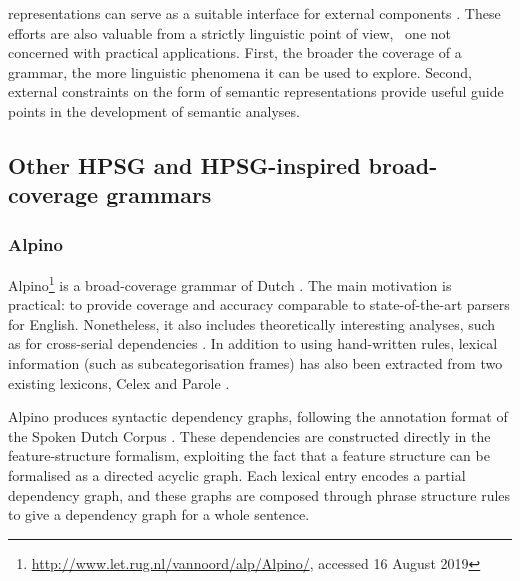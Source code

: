 \documentclass[output=paper,nonflat]{langsci/langscibook}
\begin{document}
representations can serve as a suitable interface for external
components \citep[e.g.,][]{flickinger2005sem}. 
These efforts are also valuable from a strictly linguistic point of view, \ie\ one not concerned with practical applications.
First, the broader the coverage of a grammar,
the more linguistic phenomena it can be used to explore.
Second, external constraints on the form of semantic representations provide
useful guide points in the development of semantic analyses. 


\subsection{Other HPSG and HPSG-inspired broad-coverage grammars}
\label{cl:othergrammars}

\subsubsection{Alpino}
\label{cl:other:alpino}

Alpino\footnote{%
	\url{http://www.let.rug.nl/vannoord/alp/Alpino/}, accessed 16 August 2019
}
is a broad-coverage grammar of Dutch
\citep{BvNM2001a-u,vannoord2005alpino,vannoord2006alpino}.
The main motivation is practical: to provide coverage and accuracy
comparable to state-of-the-art parsers for English.
Nonetheless, it also includes theoretically interesting analyses,
such as for cross-serial dependencies \citep{BvN98a}.
In addition to using hand-written rules,
lexical information (such as subcategorisation frames) has also been extracted from two existing lexicons,
Celex \citep{baayen1995celex}
and Parole \citep{kruyt1997parole}.

Alpino produces syntactic dependency graphs,
following the annotation format of the Spoken Dutch Corpus \citep{oostdijk2000corpus}.
These dependencies are constructed directly in the feature-structure formalism,
exploiting the fact that a feature structure can be formalised as a directed acyclic graph.
Each lexical entry encodes a partial dependency graph,
and these graphs are composed through phrase structure rules
to give a dependency graph for a whole sentence.
\end{document}
